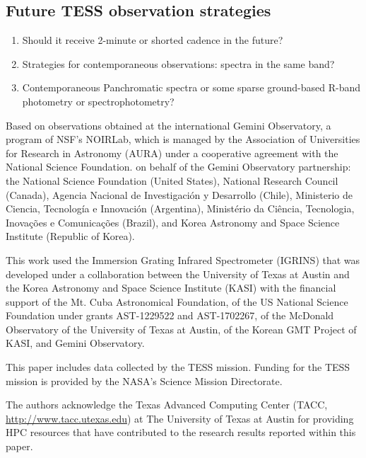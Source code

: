 \documentclass[modern]{aastex631}
\begin{document}
\subsection{Future TESS observation strategies}
\begin{enumerate}
  \item Should it receive 2-minute or shorted cadence in the future? 
  \item Strategies for contemporaneous observations: spectra in the same band?  
  \item Contemporaneous Panchromatic spectra or some sparse ground-based R-band photometry or spectrophotometry?
\end{enumerate}


\begin{acknowledgements}
Based on observations obtained at the international Gemini Observatory, a program of NSF’s NOIRLab, which is managed by the Association of Universities for Research in Astronomy (AURA) under a cooperative agreement with the National Science Foundation. on behalf of the Gemini Observatory partnership: the National Science Foundation (United States), National Research Council (Canada), Agencia Nacional de Investigaci\'{o}n y Desarrollo (Chile), Ministerio de Ciencia, Tecnolog\'{i}a e Innovaci\'{o}n (Argentina), Minist\'{e}rio da Ci\^{e}ncia, Tecnologia, Inova\c{c}\~{o}es e Comunica\c{c}\~{o}es (Brazil), and Korea Astronomy and Space Science Institute (Republic of Korea).

This work used the Immersion Grating Infrared Spectrometer (IGRINS) that was developed under a collaboration between the University of Texas at Austin and the Korea Astronomy and Space Science Institute (KASI) with the financial support of the Mt. Cuba Astronomical Foundation, of the US National Science Foundation under grants AST-1229522 and AST-1702267, of the McDonald Observatory of the University of Texas at Austin, of the Korean GMT Project of KASI, and Gemini Observatory.

This paper includes data collected by the TESS mission. Funding for the TESS mission is provided by the NASA's Science Mission Directorate.

The authors acknowledge the Texas Advanced Computing Center (TACC, \url{http://www.tacc.utexas.edu}) at The University of Texas at Austin for providing HPC resources that have contributed to the research results reported within this paper.
\end{acknowledgements}

\clearpage
\end{document}
